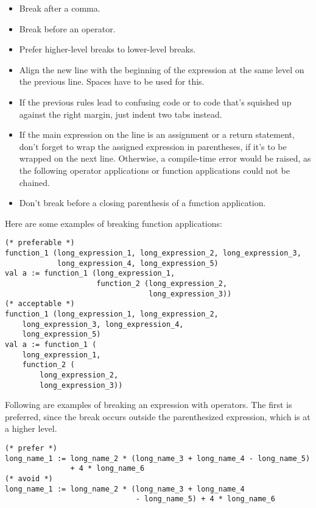 \begin{itemize}
\item Break after a comma. 
\item Break before an operator. 
\item Prefer higher-level breaks to lower-level breaks. 
\item Align the new line with the beginning of the expression at the same level on the previous line. Spaces have to be used for this. 
\item If the previous rules lead to confusing code or to code that's squished up against the right margin, just indent two tabs instead. 
\item If the main expression on the line is an assignment or a return statement, don't forget to wrap the assigned expression in parentheses, if it's to be wrapped on the next line. Otherwise, a compile-time error would be raised, as the following operator applications or function applications could not be chained. 
\item Don't break before a closing parenthesis of a function application.  
\end{itemize}

\example Here are some examples of breaking function applications: 

\begin{lstlisting}
(* preferable *)
function_1 (long_expression_1, long_expression_2, long_expression_3,
            long_expression_4, long_expression_5)
val a := function_1 (long_expression_1,
                     function_2 (long_expression_2,
                                 long_expression_3))
(* acceptable *)
function_1 (long_expression_1, long_expression_2, 
    long_expression_3, long_expression_4, 
    long_expression_5)
val a := function_1 (
    long_expression_1,
    function_2 (
        long_expression_2,
        long_expression_3))
\end{lstlisting}

\example Following are examples of breaking an expression with operators. The first is preferred, since the break occurs outside the parenthesized expression, which is at a higher level. 

\begin{lstlisting}
(* prefer *)
long_name_1 := long_name_2 * (long_name_3 + long_name_4 - long_name_5)
               + 4 * long_name_6
(* avoid *)
long_name_1 := long_name_2 * (long_name_3 + long_name_4 
                              - long_name_5) + 4 * long_name_6
\end{lstlisting}

